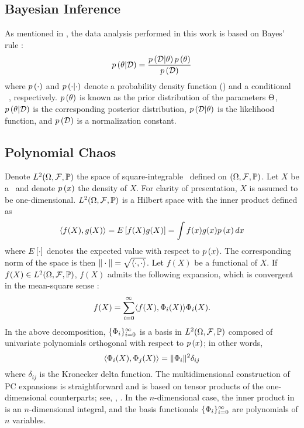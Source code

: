 \subsection{Bayesian Inference}
As mentioned in , the data analysis performed in this work is based on Bayes' rule \cite{gelman2004}:
\[
  \f{\U | \data} = \frac{\f{\data | \U} \f{\U}}{\f{\data}}
\]
where $\f{\cdot}$ and $\f{\cdot | \cdot}$ denote a probability density function (\pdf) and a conditional \pdf\ \cite{durrett2010}, respectively. $\f{\U}$ is known as the prior distribution of the parameters $\Theta$, $\f{\U | \data}$ is the corresponding posterior distribution, $\f{\data | \U}$ is the likelihood function, and $\f{\data}$ is a normalization constant.

\subsection{Polynomial Chaos}
Denote $L^{2}(\Omega, \mathcal{F}, \mathbb{P})$ the space of square-integrable \rvs\ defined on $(\Omega, \mathcal{F}, \mathbb{P})$. Let $X$ be a \rv\ and denote $\f{x}$ the density of $X$. For clarity of presentation, $X$ is assumed to be one-dimensional. $L^{2}(\Omega, \mathcal{F}, \mathbb{P})$ is a Hilbert space with the inner product defined as
\begin{equation} \elabel{inner-product}
  \iprod{f(X)}{g(X)} = \E{f(X) g(X)} = \int f(x) g(x) \f{x} dx
\end{equation}
where $\E{\cdot}$ denotes the expected value with respect to $\f{x}$. The corresponding norm of the space is then $\norm{\cdot} = \sqrt{\iprod{\cdot, \cdot}}$. Let $f(X)$ be a functional of $X$. If $f(X) \in L^{2}(\Omega, \mathcal{F}, \mathbb{P})$, $f(X)$ admits the following expansion, which is convergent in the mean-square sense \cite{maitre2010}:
\[
  f(X) = \sum_{i = 0}^\infty \iprod{f(X)}{\pcb_i(X)} \pcb_i(X).
\]
In the above decomposition, $\{ \Phi_i \}_{i = 0}^\infty$ is a basis in $L^{2}(\Omega, \mathcal{F}, \mathbb{P})$ composed of univariate polynomials orthogonal with respect to $\f{x}$; in other words,
\[
  \iprod{\pcb_i(X), \pcb_j(X)} = \norm{\pcb_i}^2 \delta_{ij}
\]
where $\delta_{ij}$ is the Kronecker delta function. The multidimensional construction of PC expansions is straightforward and is based on tensor products of the one-dimensional counterparts; see, \eg, \cite{maitre2010}. In the $n$-dimensional case, the inner product in  is an $n$-dimensional integral, and the basis functionals $\{ \Phi_i \}_{i = 0}^\infty$ are polynomials of $n$ variables.
